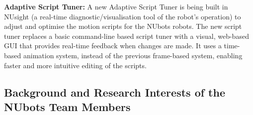 \documentclass{llncs}
\begin{document}
\noindent\textbf{Adaptive Script Tuner:}
A new Adaptive Script Tuner is being built in NUsight (a real-time diagnostic/visualisation tool of the robot's operation) to adjust and optimise the motion scripts for the NUbots robots. The new script tuner replaces a basic command-line based script tuner with a visual, web-based GUI that provides real-time feedback when changes are made. It uses a time-based animation system, instead of the previous frame-based system, enabling faster and more intuitive editing of the scripts. \\

\subsection{Background and Research Interests of the NUbots Team Members}
\end{document}
